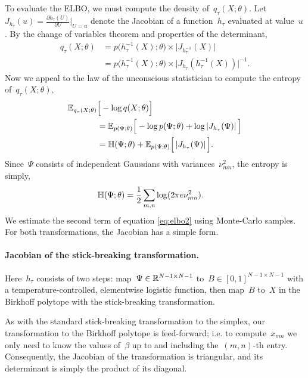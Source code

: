 To evaluate the ELBO, we must compute the density
of~$q_\tau(X; \theta)$.
Let~${J_{h_\tau}(u) = \frac{\partial h_\tau(U)}{\partial U}
  \big|_{U=u}}$ denote the Jacobian of a function~$h_\tau$ evaluated
at value~$u$. By the change of variables theorem and properties of the
determinant,
\begin{align*}
  q_\tau(X; \theta)
  &= p \big(h_\tau^{-1}(X) ;\theta \big)
    \times \big| J_{h_\tau^{-1}}(X) \big|
  \\
  &= p \big(h_\tau^{-1}(X); \theta \big)
    \times \big| J_{h_\tau}(h_\tau^{-1}(X)) \big|^{-1}.
\end{align*}
Now we appeal to the law of the unconscious statistician to compute
the entropy of~$q_\tau(X; \theta)$,
\begin{align}
  \label{eq:elbo2}
  \nonumber \mathbb{E}_{q_\tau(X; \theta)} & \Big[- \log q(X; \theta) \Big] \\
  \nonumber &= \mathbb{E}_{p(\Psi;\theta)}
              \Big[ - \log p(\Psi;\theta) +
              \log \left| J_{h_\tau}(\Psi) \right| \Big] \\
  &= \mathbb{H}(\Psi; \theta)  +
  \mathbb{E}_{p(\Psi;\theta)} \Big[ \left| J_{h_\tau}(\Psi) \right| \Big].
\end{align}
Since~$\Psi$ consists of independent Gaussians with
variances~$\nu_{mn}^2$, the entropy is simply,
\begin{align*}
  \mathbb{H}(\Psi; \theta) &=  \frac{1}{2} \sum_{m,n} \log(2 \pi e \nu_{mn}^2).
\end{align*}
We estimate the second term of equation \eqref{eq:elbo2} using
Monte-Carlo samples. For both transformations, the Jacobian has a
simple form.

\paragraph{Jacobian of the stick-breaking transformation.}
Here~$h_\tau$ consists of two steps:
map~${\Psi \in \mathbb{R}^{N-1 \times N-1}}$
to~$B \in [0,1]^{N-1 \times N-1}$ with a temperature-controlled,
elementwise logistic function, then map~$B$ to~$X$ in the Birkhoff
polytope with the stick-breaking transformation.

As with the standard stick-breaking transformation to the simplex,
our transformation to the Birkhoff polytope is feed-forward;
i.e. to compute~$x_{mn}$ we only need to know the values of~$\beta$
up to and including the~$(m,n)$-th entry. Consequently, the
Jacobian of the transformation is triangular, and its determinant
is simply the product of its diagonal.

